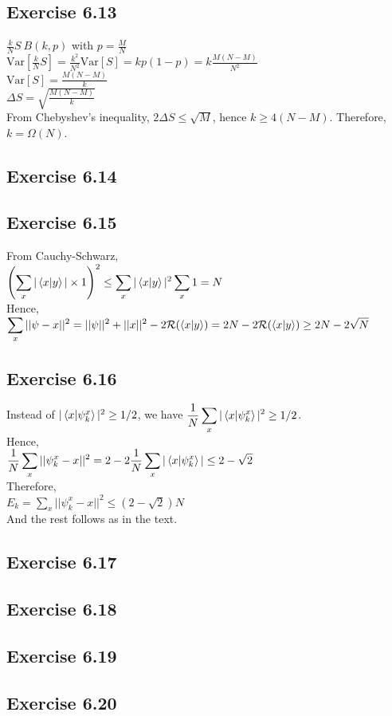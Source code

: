 \documentclass[a4paper,12pt]{article}
\begin{document}
\subsection*{Exercise 6.13}
$\frac{k}{N}S~B(k,p)$ with $p=\frac{M}{N}$\\
$\text{Var}[\frac{k}{N}S]=\frac{k^2}{N^2}\text{Var}[S]=kp(1-p)=
k\frac{M(N-M)}{N^2}$\\
$\text{Var}[S]=\frac{M(N-M)}{k}$\\
$\Delta S=\sqrt{\frac{M(N-M)}{k}}$\\
From Chebyshev's inequality, $2\Delta S\leq \sqrt{M}$, hence $k\geq 4(N-M)$.
Therefore, $k=\Omega(N)$.
\subsection*{Exercise 6.14}

\subsection*{Exercise 6.15}
From Cauchy-Schwarz,\\
$\displaystyle\left(\sum_x|\braket{x|y}|\times 1\right)^2\leq \sum_x |\braket{x|y}|^2\sum_x 1=N$\\
Hence,\\
$\displaystyle\sum_x||\psi-x||^2=||\psi||^2+||x||^2-2\mathcal{R}(\braket{x|y})=
2N-2\mathcal{R}(\braket{x|y})\geq 2N-2\sqrt{N}$
\subsection*{Exercise 6.16}
Instead of $|\braket{x|\psi_k^x}|^2\geq 1/2$, we have
$\displaystyle\frac{1}{N}\sum_x|\braket{x|\psi_k^x}|^2\geq 1/2$.\\
Hence,\\
$\displaystyle\frac{1}{N}\sum_x||\psi_k^x-x||^2=2-2\frac{1}{N}\sum_x|\braket{x|\psi_k^x}|\leq
2-\sqrt{2}$\\
Therefore,\\
$E_k=\displaystyle\sum_x||\psi_k^x-x||^2\leq (2-\sqrt{2})N$\\
And the rest follows as in the text.
\subsection*{Exercise 6.17}
\subsection*{Exercise 6.18}
\subsection*{Exercise 6.19}
\subsection*{Exercise 6.20}
\end{document}
